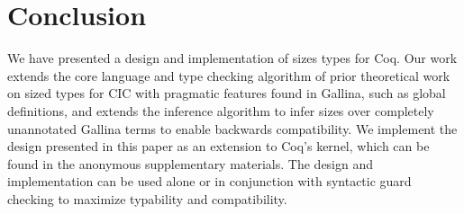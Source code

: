 \documentclass[sigplan,10pt,anonymous,review]{acmart}
\newcommand{\inmaterials}{in the anonymous supplementary materials}
\begin{document}

\section{Conclusion}
\label{sec:conclusion}
We have presented a design and implementation of sizes types for Coq.
Our work extends the core language and type checking algorithm of prior
theoretical work on sized types for CIC with pragmatic features found in
Gallina, such as global definitions, and extends the inference algorithm to
infer sizes over completely unannotated Gallina terms to enable backwards
compatibility.
We implement the design presented in this paper as an extension to Coq's kernel,
which can be found \inmaterials.
The design and implementation can be used alone or in conjunction with syntactic
guard checking to maximize typability and compatibility.




\clearpage




\end{document}
